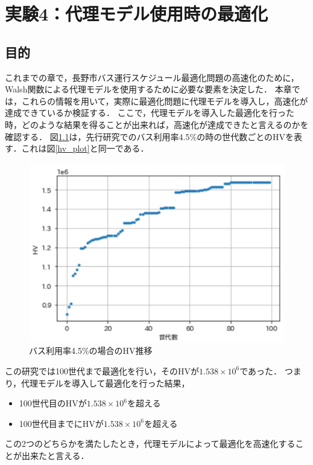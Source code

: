 \documentclass[main]{subfiles}
\begin{document}
\chapter{実験4：代理モデル使用時の最適化}
    \section{目的}
    これまでの章で，長野市バス運行スケジュール最適化問題の高速化のために，
    Walsh関数による代理モデルを使用するために必要な要素を決定した．
    本章では，これらの情報を用いて，実際に最適化問題に代理モデルを導入し，高速化が達成できているか検証する．
    ここで，代理モデルを導入した最適化を行った時，どのような結果を得ることが出来れば，高速化が達成できたと言えるのかを確認する．
    図\ref{hv_plot_}は，先行研究でのバス利用率4.5\%の時の世代数ごとのHVを表す．これは図\ref{hv_plot}と同一である．
    
    \begin{figure}
        \centering
        \includegraphics[width=\linewidth]{figures/hv_plot.png}
        \caption{バス利用率4.5\%の場合のHV推移}
        \label{hv_plot_}
    \end{figure}
    この研究では100世代まで最適化を行い，そのHVが$1.538\times 10^6$であった．
    つまり，代理モデルを導入して最適化を行った結果，
    \begin{itemize}
        \item 100世代目のHVが$1.538\times 10^6$を超える
        \item 100世代目までにHVが$1.538\times 10^6$を超える
    \end{itemize}
    この2つのどちらかを満たしたとき，代理モデルによって最適化を高速化することが出来たと言える．
    
\end{document}
